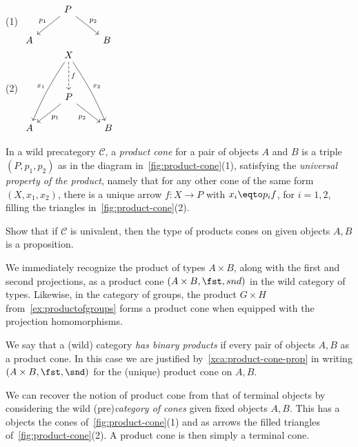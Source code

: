 \begin{marginfigure}
  \footnotesize\raggedright(1)
  $\begin{tikzcd}
    & P \ar[dl,"p_1"']\ar[dr,"p_2"] & \\
    A & & B
  \end{tikzcd}$\\
  (2)
  $\begin{tikzcd}
    & X \ar[ddl,"x_1"',bend right=5]\ar[ddr,"x_2",bend left=5]
    \ar[d,dashed,"f"] & \\[4mm]
    & P \ar[dl,"p_1"]\ar[dr,"p_2"'] & \\
    A & & B
  \end{tikzcd}$
  \caption{(1) A product cone, and (2) its universal property.}
  \label{fig:product-cone}
\end{marginfigure}
\begin{definition}\label{def:prod-in-a-cat}
  In a wild precategory $\mathcal C$, a \emph{product cone}
  for a pair of objects $A$ and $B$ is a triple $(P,p_1,p_2)$
  as in the diagram in~\cref{fig:product-cone}(1),
  satisfying the \emph{universal property of the product},
  namely that for any other cone of the same form $(X,x_1,x_2)$,
  there is a unique arrow $f : X \to P$ with $x_i \eqto p_if$, for $i=1,2$,
  \ie filling the triangles in~\cref{fig:product-cone}(2).
\end{definition}
\begin{xca}\label{xca:product-cone-prop}
  Show that if $\mathcal C$ is univalent, then the type of products cones
  on given objects $A,B$ is a proposition.
\end{xca}

We immediately recognize the product of types $A\times B$,
along with the first and second projections,
as a product cone $(A\times B,\fst,snd)$ in the wild category of types.
Likewise, in the category of groups,
the product $G\times H$ from~\cref{ex:productofgroups}
forms a product cone when equipped with the projection homomorphisms.

We say that a (wild) category \emph{has binary products}
if every pair of objects $A,B$ as a product cone.
In this case we are justified by~\cref{xca:product-cone-prop}
in writing $(A\times B,\fst,\snd)$ for the (unique) product cone
on $A,B$.

\begin{remark}\label{def:product-cones-as-terminal}
  We can recover the notion of product cone from that
  of terminal objects by considering the wild (pre)\emph{category of cones}
  given fixed objects $A,B$. This has a objects the cones
  of~\cref{fig:product-cone}(1) and as arrows
  the filled triangles of~\cref{fig:product-cone}(2).
  A product cone is then simply a terminal cone.
\end{remark}

